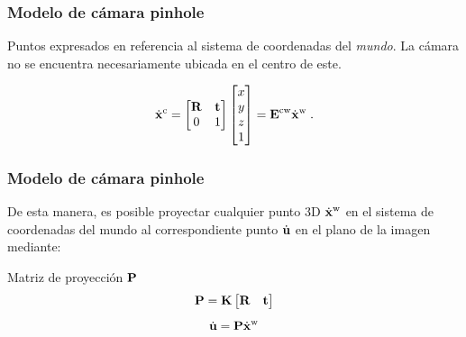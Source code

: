 \documentclass[compress]{beamer}
\begin{document}
\begin{frame}
\frametitle{Modelo de cámara pinhole}



Puntos expresados en referencia al sistema de coordenadas del \textit{mundo}. La cámara no se encuentra necesariamente ubicada en el centro de este.

\begin{figure}[!htb]
	\centering
	\hfill
\end{figure}

\begin{block}{}
\begin{equation}
\dot{\boldsymbol{\mathbf{x}}}^{\mathrm{c}}=\begin{bmatrix}\boldsymbol{\mathbf{R}} & \boldsymbol{\mathbf{t}}\\
0 & 1
\end{bmatrix}\begin{bmatrix}x\\
y\\
z\\
1
\end{bmatrix}=\boldsymbol{\mathbf{E}}^{\mathrm{c}\mathrm{w}}\dot{\boldsymbol{\mathbf{x}}}^{\mathrm{w}}\;.
\end{equation}
\end{block}

\end{frame}


\begin{frame}
\frametitle{Modelo de cámara pinhole}

De esta manera, es posible proyectar cualquier punto 3D
$\dot{\boldsymbol{\mathbf{x}}}^{\mathrm{w}}$ en el sistema de coordenadas del mundo al correspondiente
punto $\dot{\boldsymbol{\mathbf{u}}}$ en el plano de la imagen mediante:

\begin{block}{Matriz de proyección \textmd{$\boldsymbol{\mathbf{P}}$}}
\begin{equation}
\boldsymbol{\mathbf{P}}=\boldsymbol{\mathbf{K}}\begin{bmatrix}\boldsymbol{\mathbf{R}} & \boldsymbol{\mathbf{t}}\end{bmatrix}
\end{equation}
\begin{equation}
\dot{\boldsymbol{\mathbf{u}}}=\boldsymbol{\mathbf{P}}\dot{\boldsymbol{\mathbf{x}}}^{\mathrm{w}}
\end{equation}
\end{block}

\end{frame}
\end{document}
